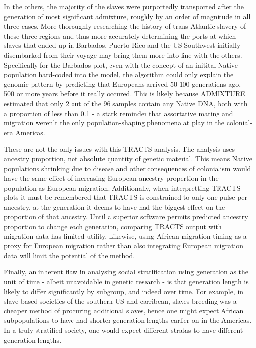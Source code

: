 \documentclass[11pt]{article}
\begin{document}
In the others, the majority of the slaves were purportedly transported after the generation of most significant admixture, roughly by an order of magnitude in all three cases. More thoroughly researching the history of trans-Atlantic slavery of these three regions and thus more accurately determining the ports at which slaves that ended up in Barbados, Puerto Rico and the US Southwest initially disembarked from their voyage may bring them more into line with the others. Specifically for the Barbados plot, even with the concept of an initital Native population hard-coded into the model, the algorithm could only explain the genomic pattern by predicting that Europeans arrived 50-100 generations ago, 500 or more years before it really occured. This is likely because ADMIXTURE estimated that only 2 out of the 96 samples contain any Native DNA, both with a proportion of less than 0.1 - a stark reminder that assortative mating and migration weren't the only population-shaping phenomena at play in the colonial-era Americas.

These are not the only issues with this TRACTS analysis. The analysis uses ancestry proportion, not absolute quantity of genetic material. This means Native populations shrinking due to disease and other consequences of colonialism would have the same effect of increasing European ancestry proportion in the population as European migration. Additionally, when interpretting TRACTS plots it must be remembered that TRACTS is constrained to only one pulse per ancestry, at the generation it deems to have had the biggest effect on the proportion of that ancestry. Until a superior software permits predicted ancestry proportion to change each generation, comparing TRACTS output with migration data has limited utility. Likewise, using African migration timing as a proxy for European migration rather than also integrating European migration data will limit the potential of the method.

Finally, an inherent flaw in analysing social stratification using generation as the unit of time - albeit unavoidable in genetic research - is that generation length is likely to differ significantly by subgroup, and indeed over time. For example, in slave-based societies of the southern US and carribean, slaves breeding was a cheaper method of procuring additional slaves, hence one might expect African subpopulations to have had shorter generation lengths earlier on in the Americas. In a truly stratified society, one would expect different stratas to have different generation lengths. 
\end{document}
